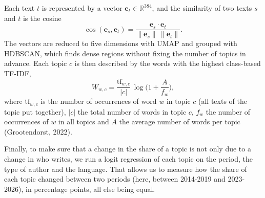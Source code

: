 \documentclass[11pt,a4paper]{article}
\begin{document}
Each text $t$ is represented by a vector $\mathbf{e}_t \in \mathbb{R}^{384}$, and the similarity of two 
texts $s$ and $t$ is the cosine
\begin{equation}\label{eq:cosine}
\cos(\mathbf{e}_s, \mathbf{e}_t) = \frac{\mathbf{e}_s\cdot\mathbf{e}_t}{\lVert\mathbf{e}_s\rVert\,\lVert\mathbf{e}_t\rVert}.
\end{equation}
The vectors are reduced to five dimensions with UMAP and grouped with HDBSCAN, which finds dense regions 
without fixing the number of topics in advance. Each topic $c$ is then described by the 
words with the highest class-based TF-IDF,
\begin{equation}\label{eq:ctfidf}
W_{w,c} = \frac{\text{tf}_{w,c}}{|c|}\,\log\Big(1 + \frac{A}{f_w}\Big),
\end{equation}
where $\text{tf}_{w,c}$ is the number of occurrences of word $w$ in topic $c$ (all texts of the topic put together), 
$|c|$ the total number of words in topic $c$, $f_w$ the number of occurrences of $w$ in all topics and $A$ the average number of words per topic 
(Grootendorst, 2022).


Finally, to make sure that a change in the share of a topic is not only due to a change in who 
writes, we run a logit regression of each topic on the period, the type of author and the language. 
That allows us to measure how the share of each topic changed between two periods (here, between 
2014-2019 and 2023-2026), in percentage points, all else being equal.
\end{document}
